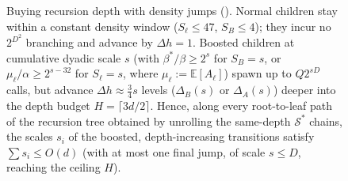 \documentclass[11pt]{article}
\theoremstyle{definition}
\renewcommand{\label}[1]{}%
\newcommand{\E}{\mathbb{E}}
\newcommand{\dens}[1]{\E[#1]}
\begin{document}
\begin{figure}[t]
\caption{Buying recursion depth with density jumps (). Normal children stay within a constant density window ($S_\ell \le 47$, $S_B \le 4$); they incur no $2^{D^2}$ branching and advance by $\Delta h = 1$. Boosted children at cumulative dyadic scale $s$ (with $\beta^*/\beta \ge 2^s$ for $S_B = s$, or $\mu_\ell/\alpha \ge 2^{s-32}$ for $S_\ell = s$, where $\mu_\ell := \dens{A_\ell}$) spawn up to $Q 2^{s D}$ calls, but advance $\Delta h \approx \frac{3}{4}s$ levels ($\Delta_B(s)$ or $\Delta_A(s)$) deeper into the depth budget $H = \lceil 3d/2 \rceil$. Hence, along every root-to-leaf path of the recursion tree obtained by unrolling the same-depth $\mathcal{S}^*$ chains, the scales $s_i$ of the boosted, depth-increasing transitions satisfy $\sum s_i \le O(d)$ (with at most one final jump, of scale $s \le D$, reaching the ceiling $H$).}
\label{fig:depth-jumps}
\end{figure}
\end{document}
